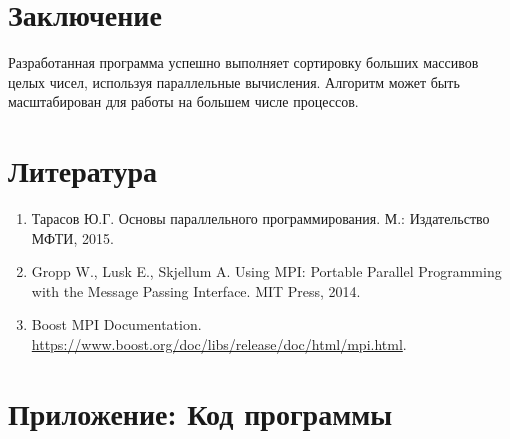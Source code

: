 ﻿\documentclass[a4paper,12pt]{article}
\begin{document}
\section*{Заключение}
Разработанная программа успешно выполняет сортировку больших массивов целых чисел, используя параллельные вычисления. Алгоритм может быть масштабирован для работы на большем числе процессов.

\section*{Литература}
\begin{enumerate}
    \item Тарасов Ю.Г. Основы параллельного программирования. М.: Издательство МФТИ, 2015.
    \item Gropp W., Lusk E., Skjellum A. Using MPI: Portable Parallel Programming with the Message Passing Interface. MIT Press, 2014.
    \item Boost MPI Documentation. \url{https://www.boost.org/doc/libs/release/doc/html/mpi.html}.
\end{enumerate}

\section*{Приложение: Код программы}
\end{document}
